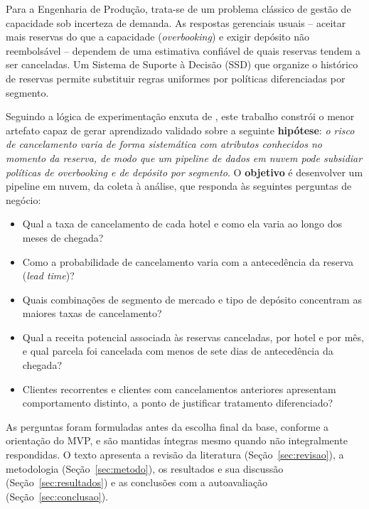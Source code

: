 \documentclass[11pt,a4paper]{article}
\newcommand{\Q}[1]{\textbf{Q#1}}
\begin{document}
Para a Engenharia de Produção, trata-se de um problema clássico de gestão de capacidade sob incerteza de demanda. As respostas gerenciais usuais -- aceitar mais reservas do que a capacidade (\textit{overbooking}) e exigir depósito não reembolsável -- dependem de uma estimativa confiável de quais reservas tendem a ser canceladas. Um Sistema de Suporte à Decisão (SSD) que organize o histórico de reservas permite substituir regras uniformes por políticas diferenciadas por segmento.

Seguindo a lógica de experimentação enxuta de \citet{ries2011}, este trabalho constrói o menor artefato capaz de gerar aprendizado validado sobre a seguinte \textbf{hipótese}: \textit{o risco de cancelamento varia de forma sistemática com atributos conhecidos no momento da reserva, de modo que um pipeline de dados em nuvem pode subsidiar políticas de overbooking e de depósito por segmento}. O \textbf{objetivo} é desenvolver um pipeline em nuvem, da coleta à análise, que responda às seguintes perguntas de negócio:

\begin{itemize}
  \item[\Q{1}] Qual a taxa de cancelamento de cada hotel e como ela varia ao longo dos meses de chegada?
  \item[\Q{2}] Como a probabilidade de cancelamento varia com a antecedência da reserva (\textit{lead time})?
  \item[\Q{3}] Quais combinações de segmento de mercado e tipo de depósito concentram as maiores taxas de cancelamento?
  \item[\Q{4}] Qual a receita potencial associada às reservas canceladas, por hotel e por mês, e qual parcela foi cancelada com menos de sete dias de antecedência da chegada?
  \item[\Q{5}] Clientes recorrentes e clientes com cancelamentos anteriores apresentam comportamento distinto, a ponto de justificar tratamento diferenciado?
\end{itemize}

As perguntas foram formuladas antes da escolha final da base, conforme a orientação do MVP, e são mantidas íntegras mesmo quando não integralmente respondidas. O texto apresenta a revisão da literatura (Seção~\ref{sec:revisao}), a metodologia (Seção~\ref{sec:metodo}), os resultados e sua discussão (Seção~\ref{sec:resultados}) e as conclusões com a autoavaliação (Seção~\ref{sec:conclusao}).

\end{document}
